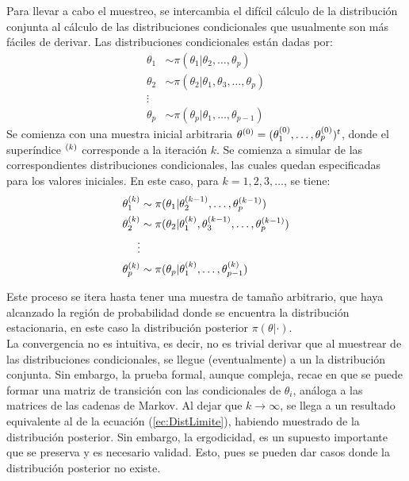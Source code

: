 \documentclass[../Main/Main.tex]{subfiles}
\begin{document}
Para llevar a cabo el muestreo, se intercambia el difícil cálculo de la distribución conjunta al cálculo de las distribuciones condicionales que usualmente son más fáciles de derivar. Las distribuciones condicionales están dadas por: 
\begin{align}
	\theta_1 &\sim \pi(\theta_1|\theta_2,\ldots,\theta_p) \label{ec:DistCondicionales}\\
	\theta_2 &\sim \pi(\theta_2|\theta_1,\theta_3,\ldots,\theta_p)\nonumber \\ 
	\vdots \nonumber\\
	\theta_p &\sim \pi(\theta_p|\theta_1,\ldots,\theta_{p-1}) \nonumber
\end{align}
Se comienza con una muestra inicial arbitraria $\theta^{(0)} = (\theta_1^{(0)},\ldots,\theta_p^{(0)})^t$, donde el superíndice $^{(k)}$ corresponde a la iteración $k$. Se comienza a simular de las correspondientes distribuciones condicionales, las cuales quedan especificadas para los valores iniciales. En este caso, para $k = 1,2,3,\ldots$, se tiene:
\begin{align}
	\theta_1^{(k)} &\sim \pi(\theta_1|\theta_2^{(k-1)},\ldots,\theta_p^{(k-1)}) \label{ec:GibbsSampler}\\
	\theta_2^{(k)} &\sim \pi(\theta_2|\theta_1^{(k)},\theta_3^{(k-1)},\ldots,\theta_p^{(k-1)})\nonumber \\ 
	\vdots \nonumber\\
	\theta_p^{(k)} &\sim \pi(\theta_p|\theta_1^{(k)},\ldots,\theta_{p-1}^{(k)}) \nonumber
\end{align}

Este proceso se itera hasta tener una muestra de tamaño arbitrario, que haya alcanzado la región de probabilidad donde se encuentra la distribución estacionaria, en este caso la distribución posterior $\pi(\theta|\cdot)$.\\

La convergencia no es intuitiva, es decir, no es trivial derivar que al muestrear de las distribuciones condicionales, se llegue (eventualmente) a un la distribución conjunta. Sin embargo, la prueba formal, aunque compleja, recae en que se puede formar una matriz de transición con las condicionales de $\theta_i$, análoga a las matrices de las cadenas de Markov. Al dejar que  $k\rightarrow\infty$, se llega a un resultado equivalente al de la ecuación (\ref{ec:DistLimite}), habiendo muestrado de la distribución posterior. Sin embargo, la ergodicidad, es un supuesto importante que se preserva y es necesario validad. Esto, pues se pueden dar casos donde la distribución posterior no existe.\\
\end{document}
